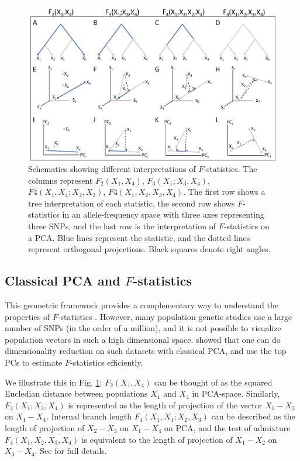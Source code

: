 \documentclass[12pt]{article}
\begin{document}
\begin{figure}[ht!]
    \includegraphics[width=16.5cm]{Images/Figures/overview.png}
    \centering
    \caption{Schematics showing different interpretations of $F$-statistics. The columns represent $F_2(X_1,X_4)$, $F_3(X_1;X_3,X_4)$, $F4(X_1,X_4;X_2,X_3)$, $F4(X_1,X_2,X_3,X_4)$. The first row shows a tree interpretation of each statistic, the second row shows $F$-statistics in an allele-frequency space with three axes representing three SNPs, and the last row is the interpretation of $F$-statistics on a PCA. Blue lines represent the statistic, and the dotted lines represent orthogonal projections. Black squares denote right angles.}
    \label{fig2:overview}
\end{figure}


\subsection{Classical PCA and $F$-statistics}\label{theory-pca-fstats}

This geometric framework provides a complementary way to understand the properties of $F$-statistics \citep{oteo-garcia_geometrical_2021}. However, many population genetic studies use a large number of SNPs (in the order of a million), and it is not possible to visualize population vectors in such a high dimensional space. \cite{peter_geometric_2022} showed that one can do dimensionality reduction on such datasets with classical PCA, and use the top PCs to estimate $F$-statistics efficiently.

We illustrate this in Fig. \ref{fig2:overview}:  $F_2(X_1,X_4)$ can be thought of as the squared Eucledian distance between populations $X_1$ and $X_4$ in PCA-space. Similarly, $F_3(X_1;X_3,X_4)$ is represented as the length of projection of the vector $X_1-X_3$ on $X_1-X_4$. Internal branch length $F_4(X_1,X_4;X_2,X_3)$ can be described as the length of projection of $X_2-X_3$ on $X_1-X_4$ on PCA, and the test of admixture $F_4(X_1,X_2,X_3,X_4)$ is equivalent to the length of projection of $X_1-X_2$ on $X_3-X_4$. See \cite{peter_geometric_2022} for full details.
\end{document}
